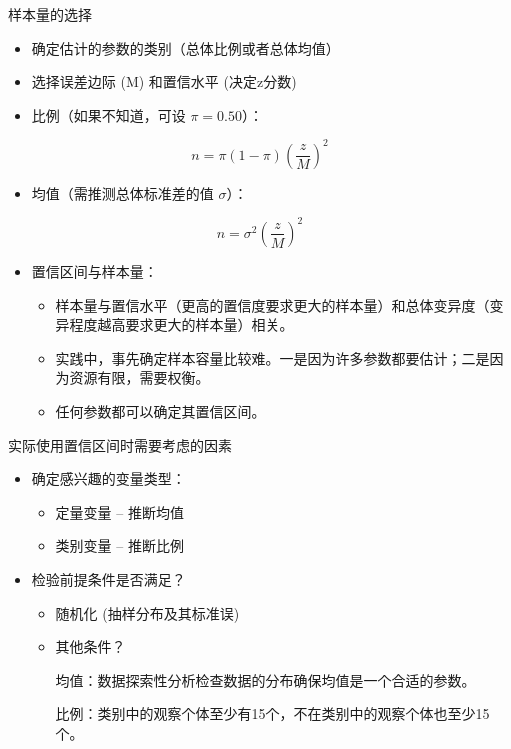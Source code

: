 \documentclass[presentation]{beamer}
\begin{document}
\begin{frame}[label={sec:orgd0bccea}]{样本量的选择}
\begin{itemize}
\item 确定估计的参数的类别（总体比例或者总体均值）

\item 选择误差边际 (M) 和置信水平 (决定z分数)

\item 比例（如果不知道，可设 \(\pi=0.50\)）：
\end{itemize}

$$n=\pi (1-\pi)(\frac{z}{M})^2$$

\begin{itemize}
\item 均值（需推测总体标准差的值 \(\sigma\)）：
\end{itemize}

$$n=\sigma^2(\frac{z}{M})^2$$

\begin{itemize}
\item 置信区间与样本量：

\begin{itemize}
\item 样本量与置信水平（更高的置信度要求更大的样本量）和总体变异度（变异程度越高要求更大的样本量）相关。

\item 实践中，事先确定样本容量比较难。一是因为许多参数都要估计；二是因为资源有限，需要权衡。

\item 任何参数都可以确定其置信区间。
\end{itemize}
\end{itemize}
\end{frame}

\begin{frame}[label={sec:orgb5fe7ab}]{实际使用置信区间时需要考虑的因素}
\begin{itemize}
\item 确定感兴趣的变量类型：
\begin{itemize}
\item 定量变量 – 推断均值
\item 类别变量 – 推断比例
\end{itemize}

\item 检验前提条件是否满足？
\begin{itemize}
\item 随机化 (抽样分布及其标准误)

\item 其他条件？

均值：数据探索性分析检查数据的分布确保均值是一个合适的参数。

比例：类别中的观察个体至少有15个，不在类别中的观察个体也至少15个。
\end{itemize}
\end{itemize}
\end{frame}
\end{document}
